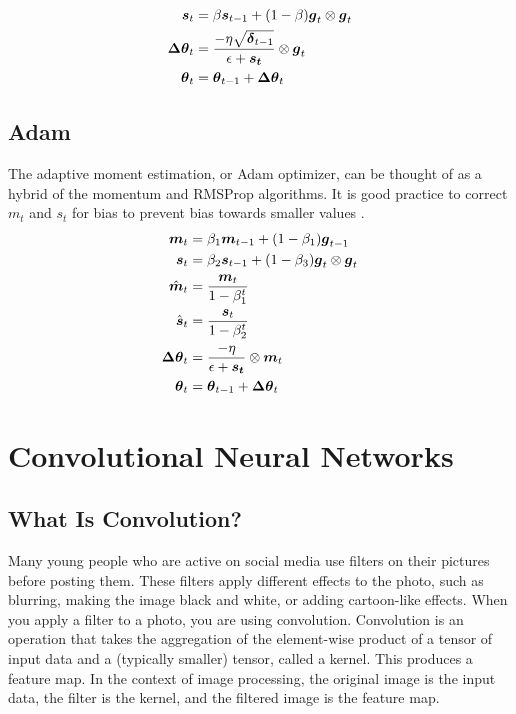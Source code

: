 \documentclass{article}
\begin{document}
\begin{align*}
    \vb*{s}_t &= \beta \vb*{s}_{t-1} + (1-\beta)\vb*{g}_t \otimes \vb*{g}_t \\
    \vb*{\Delta \theta}_t &= \frac{-\eta \sqrt{\vb*{\delta}_{t-1}}}{\epsilon + \vb*{s_t}} \otimes \vb*{g}_t \\
    \vb*{\theta}_t &= \vb*{\theta}_{t-1} + \vb*{\Delta \theta}_t
\end{align*}

\subsection{Adam} %

The adaptive moment estimation, or Adam optimizer, can be thought of as a hybrid of the momentum and RMSProp algorithms. It is good practice to correct \(m_t\) and \(s_t\) for bias to prevent bias towards smaller values \cite{pml1book}. %
\begin{align*}
    \vb*{m}_t &= \beta_1 \vb*{m}_{t-1} + (1-\beta_1)\vb*{g}_{t-1} \\
    \vb*{s}_t &= \beta_2 \vb*{s}_{t-1} + (1-\beta_3)\vb*{g}_t \otimes \vb*{g}_t \\
    \hat{\vb*{m}}_t &= \frac{\vb*{m}_t}{1-\beta^t_1} \\ 
    \hat{\vb*{s}}_t &= \frac{\vb*{s}_t}{1-\beta^t_2} \\ 
    \vb*{\Delta \theta}_t &= \frac{-\eta}{\epsilon + \vb*{s_t}} \otimes \vb*{m}_t \\
    \vb*{\theta}_t &= \vb*{\theta}_{t-1} + \vb*{\Delta \theta}_t
\end{align*}

\section{Convolutional Neural Networks}


\subsection{What Is Convolution?}

Many young people who are active on social media use filters on their pictures before posting them. These filters apply different effects to the photo, such as blurring, making the image black and white, or adding cartoon-like effects. When you apply a filter to a photo, you are using convolution. Convolution is an operation that takes the aggregation of the element-wise product of a tensor of input data and a (typically smaller) tensor, called a kernel. This produces a feature map. In the context of image processing, the original image is the input data, the filter is the kernel, and the filtered image is the feature map. 
\end{document}
